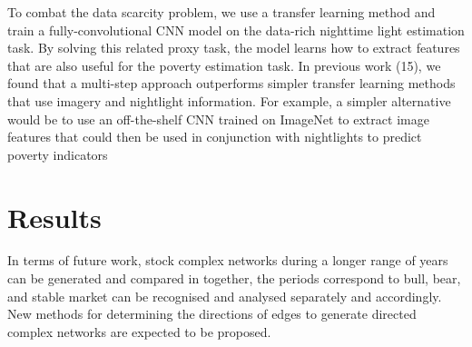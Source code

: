 To combat the data scarcity problem, we use a transfer learning method and train a fully-convolutional CNN model on the data-rich nighttime light estimation task. By solving this related proxy task, the model learns how to extract features that are also useful for the poverty estimation task. In previous work (15), we found that a multi-step approach outperforms simpler transfer learning methods that use imagery and nightlight information. For example, a simpler alternative would be to use an off-the-shelf CNN trained on ImageNet to extract image features that could then be used in conjunction with nightlights to predict poverty indicators



\section{Results}
In terms of future work, stock complex networks during a longer range of years can be generated and compared in together, the periods correspond to bull, bear, and stable market can be recognised and analysed separately and accordingly. New methods for determining the directions of edges to generate directed complex networks are expected to be proposed.

